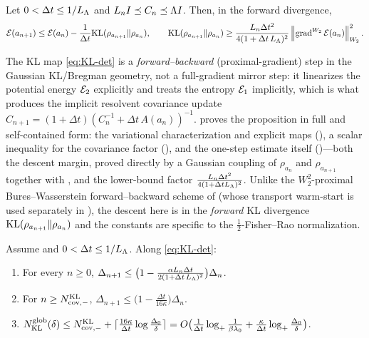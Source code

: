 \begin{proposition}
\label{prop:KL-onestep}
Let $0<\Delta t\leq1/L_\Lambda$ and $L_nI\preceq C_n\preceq\Lambda I$. Then, in the forward divergence,
\[
    \mathcal{E}(a_{n+1})\leq\mathcal{E}(a_n)-\frac1{\Delta t}\mathrm{KL}(\rho_{a_{n+1}}\|\rho_{a_n}),
    \qquad
    \mathrm{KL}(\rho_{a_{n+1}}\|\rho_{a_n})
    \geq\frac{L_n\Delta t^2}{4(1+\Delta t\,L_\Lambda)^2}\left\lVert \operatorname{grad}^{W_2}\mathcal{E}(a_n)\right\rVert_{W_2}^2 .
\]
\end{proposition}

The KL map \eqref{eq:KL-det} is a \emph{forward--backward} (proximal-gradient) step in the Gaussian
KL/Bregman geometry, not a full-gradient mirror step: it linearizes the potential energy $\mathcal{E}_2$
explicitly and treats the entropy $\mathcal{E}_1$ implicitly, which is what produces the implicit resolvent
covariance update $C_{n+1}=(1+\Delta t)(C_n^{-1}+\Delta t\,A(a_n))^{-1}$.  proves
the proposition in full and self-contained form: the variational characterization and explicit maps
(), a scalar inequality for the covariance factor (), and the
one-step estimate itself ()---both the descent margin, proved directly by a
Gaussian coupling of $\rho_{a_n}$ and $\rho_{a_{n+1}}$ together with , and the
lower-bound factor $\tfrac{L_n\Delta t^2}{4(1+\Delta tL_\Lambda)^2}$. Unlike the $W_2^2$-proximal
Bures--Wasserstein forward--backward scheme of \citet{diao2023forward,lambert2022variational} (whose
transport warm-start is used separately in ), the descent here is in the
\emph{forward} KL divergence $\mathrm{KL}(\rho_{a_{n+1}}\|\rho_{a_n})$ and the constants are specific to the
$\tfrac12$-Fisher--Rao normalization.

\begin{theorem}
\label{thm:KL-global}
Assume  and $0<\Delta t\leq1/L_\Lambda$. Along \eqref{eq:KL-det}:
\begin{enumerate}
\item For every $n\geq0$,
$\Delta_{n+1}\leq\bigl(1-\tfrac{\alpha L_n\Delta t}{2(1+\Delta t\,L_\Lambda)^2}\bigr)\Delta_n$.
\item For $n\geq N_{\mathrm{cov},-}^{\mathrm{KL}}$, $\Delta_{n+1}\leq\bigl(1-\tfrac{\Delta t}{16\kappa}\bigr)\Delta_n$.
\item $N_{\mathrm{KL}}^{\mathrm{glob}}(\delta)\leq N_{\mathrm{cov},-}^{\mathrm{KL}}+\lceil\tfrac{16\kappa}{\Delta t}\log\tfrac{\Delta_0}\delta\rceil
=O\bigl(\tfrac1{\Delta t}\log_+\tfrac1{\beta\lambda_0}+\tfrac\kappa{\Delta t}\log_+\tfrac{\Delta_0}\delta\bigr)$.
\end{enumerate}
\end{theorem}

